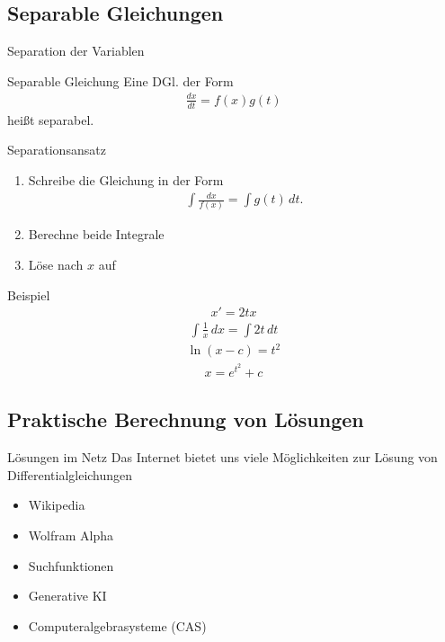 \documentclass[notheorems,hidelinks,aspectratio=1610]{beamer}
\begin{document}
\subsection{Separable Gleichungen}
\frame{\subtoc}

\begin{frame}{Separation der Variablen}
  \begin{block}{Separable Gleichung}
    Eine DGl. der Form
    \begin{gather*}
      \frac{dx}{dt} = f(x)g(t)
    \end{gather*}
    heißt separabel.
  \end{block}

  \pause
  \begin{block}{Separationsansatz}
    \begin{enumerate}
    \item Schreibe die Gleichung in der Form
      \begin{gather*}
        \int \frac{dx}{f(x)} = \int g(t) \,dt.
      \end{gather*}
    \item Berechne beide Integrale
    \item Löse nach $x$ auf
    \end{enumerate}
  \end{block}
\end{frame}

\begin{frame}{Beispiel}
  \begin{gather*}
    x' = 2tx
  \end{gather*}
  \pause
  \begin{gather*}
    \int \frac1x\,dx = \int 2t \,dt
  \end{gather*}
  \pause
  \begin{gather*}
    \ln(x-c) = t^2
  \end{gather*}
  \pause
  \begin{gather*}
    x = e^{t^2}+c
  \end{gather*}
\end{frame}

\subsection{Praktische Berechnung von Lösungen}
\frame{\subtoc}

\begin{frame}{Lösungen im Netz}
  Das Internet bietet uns viele Möglichkeiten zur Lösung von
  Differentialgleichungen
  \begin{itemize}
  \item Wikipedia
  \item Wolfram Alpha
  \item Suchfunktionen
  \item Generative KI
  \item Computeralgebrasysteme (CAS)
  \end{itemize}
\end{frame}
\end{document}

